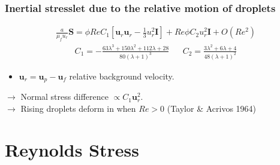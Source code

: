 \documentclass{sintefbeamer}
\begin{document}
\begin{frame}
  \frametitle{Inertial stresslet due to the relative motion of droplets}


  \begin{align*}
    \frac{a}{\mu_f u_r} \bm S
     =
    \phi Re C_1
    [
      \textbf{u}_r\textbf{u}_r - \frac{1}{3}u_r^2\textbf{I} 
      ]
      + Re \phi C_2 u_r^2 \textbf{I}
      + O(Re^2)
  \end{align*} 
\begin{align*}
    C_1  =  -\frac{63 \lambda^{3} + 150 \lambda^{2} + 112 \lambda + 28}{80 \left(\lambda + 1\right)^{3}}
    &&
    C_2  = \frac{3\lambda^2 + 6\lambda + 4}{48(\lambda +1 )^2}
  \end{align*}
  

  \begin{itemize}
    \item $\textbf{u}_r =\textbf{u}_p - \textbf{u}_f$ relative background velocity. 
  \end{itemize}


$\to$ Normal stress difference $\propto C_1 \bm u_r^2$.\\

$\to$ Rising droplets deform in when $Re > 0$ (Taylor \& Acrivos 1964)%


\end{frame}




\section{Reynolds Stress}
\end{document}
